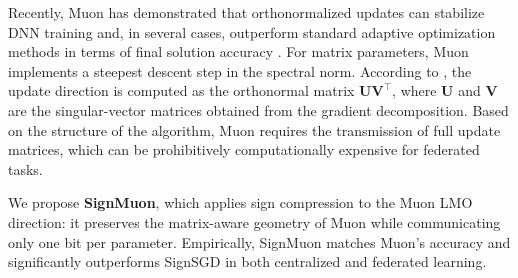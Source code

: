 \documentclass{article}
\begin{document}
Recently, Muon has demonstrated that orthonormalized updates can stabilize DNN training and, in several cases, outperform standard adaptive optimization methods in terms of final solution accuracy \cite{jordan2024muon, bernstein2024old, shah2025practical}. For matrix parameters, Muon implements a steepest descent step in the spectral norm. According to \citet{jordan2024muon}, the update direction is computed as the orthonormal matrix $\mathbf{U}\mathbf{V}^{\top}$, where $\mathbf{U}$ and $\mathbf{V}$ are the singular-vector matrices obtained from the gradient decomposition. Based on the structure of the algorithm, Muon requires the transmission of full update matrices, which can be prohibitively computationally expensive for federated tasks.

We propose \textbf{SignMuon}, which applies sign compression to the Muon LMO direction: it preserves the matrix-aware geometry of Muon while communicating only one bit per parameter. Empirically, SignMuon matches Muon's accuracy and significantly outperforms SignSGD in both centralized and federated learning.
\end{document}
